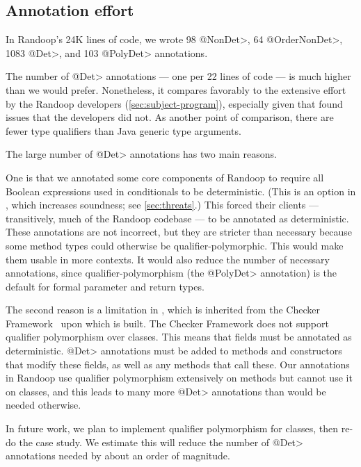 \subsection{Annotation effort}

In Randoop's 24K lines of code, we wrote
98 \<@NonDet>,
64 \<@OrderNonDet>,
1083 \<@Det>,
and 103 \<@PolyDet> annotations.

The number of \<@Det> annotations --- one per 22 lines of code --- is much
higher than we would prefer.
Nonetheless, it compares favorably to the
extensive effort by the Randoop developers (\cref{sec:subject-program}),
especially given that \theDeterminismChecker found issues that the
developers did not.
As another point of comparison,
there are fewer type qualifiers than Java generic type arguments.

The large number of \<@Det> annotations has two main reasons.

One is that we annotated some core components of Randoop to require all
Boolean expressions used in conditionals to be deterministic.  (This is an
option in \theDeterminismCheckerImplementation, which increases soundness;
see \cref{sec:threats}.)  This forced
their clients --- transitively, much of the Randoop codebase --- to be
annotated as deterministic.
These annotations are not incorrect, but they are stricter than necessary
because some method types could otherwise be qualifier-polymorphic.
This would make them usable in more contexts.  It would also reduce the
number of necessary annotations, since qualifier-polymorphism (the
\<@PolyDet> annotation) is the default for
formal parameter and return types.

The second reason is a limitation in \theDeterminismCheckerImplementation,
which is inherited from the Checker Framework~\cite{checker-framework-tool} upon which
\theDeterminismChecker is built.
The Checker Framework does not support qualifier polymorphism over
classes.  This means that fields must be annotated as deterministic.
\<@Det> annotations must be added to methods and constructors that modify these
fields, as well as any methods that call these.
Our annotations in
Randoop use qualifier polymorphism extensively on methods but cannot use it
on classes, and this leads to many more \<@Det> annotations than would be
needed otherwise.

In future work, we plan to implement qualifier polymorphism for classes,
then re-do the case study.  We estimate this will reduce the number of
\<@Det> annotations needed by about an order of magnitude.


